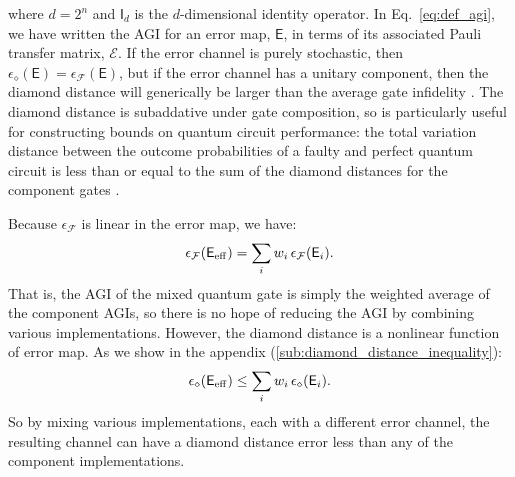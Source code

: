 \documentclass[aps,nofootinbib,pra,notitlepage,twocolumn]{revtex4-1}
\newcommand{\error}{\ensuremath{{\mathsf{E}}}}
\begin{document}
where $d=2^n$ and $\mathsf{I}_d$ is the $d$-dimensional identity operator.  In Eq.~\eqref{eq:def_agi}, we have written the AGI for an error map, $\mathsf{E}$, in terms of its associated Pauli transfer matrix, $\mathcal{E}$. If the error channel is purely stochastic, then $\epsilon_\diamond(\error) = \epsilon_\mathcal{F}(\error)$, but if the error channel has a unitary component, then the diamond distance will generically be larger than the average gate infidelity \cite{1511.00727}. The diamond distance is subaddative \cite{watrous2018theory} under gate composition, so is particularly useful for constructing bounds on quantum circuit performance: the total variation distance between the outcome probabilities of a faulty and perfect quantum circuit is less than or equal to the sum of the diamond distances for the component gates \cite{aharonov1998quantum}. 

Because $\epsilon_{\mathcal{F}}$ is linear in the error map, we have:
\begin{equation}
	\epsilon_{\mathcal{F}}\!\left(\mathsf{E}_{\rm eff}\right) = \sum_i w_i \,\epsilon_{\mathcal{F}}(\mathsf{E}_i).
\end{equation}
That is, the AGI of the mixed quantum gate is simply the weighted average of the component AGIs, so there is no hope of reducing the AGI by combining various implementations. However, the diamond distance is a nonlinear function of error map. As we show in the appendix (\ref{sub:diamond_distance_inequality}):
\begin{equation}
	\label{eq:diamond_ineq}
	\epsilon_\diamond\!\left(\mathsf{E}_{\rm eff}\right) \le \sum_i w_i \, \epsilon_\diamond(\mathsf{E}_i).
\end{equation}
So by mixing various implementations, each with a different error channel, the resulting channel can have a diamond distance error less than any of the component implementations. 
\end{document}
